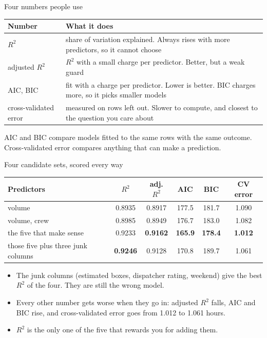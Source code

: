 \documentclass[aspectratio=169]{beamer}
\begin{document}
\begin{frame}{Four numbers people use}
\begin{center}\small
\begin{tabular}{L{0.22\textwidth} L{0.70\textwidth}}
\toprule
\textbf{Number} & \textbf{What it does} \\
\midrule
$R^2$ & share of variation explained. Always rises with more predictors, so it cannot choose \\
adjusted $R^2$ & $R^2$ with a small charge per predictor. Better, but a weak guard \\
AIC, BIC & fit with a charge per predictor. Lower is better. BIC charges more, so it picks
smaller models \\
cross-validated error & measured on rows left out. Slower to compute, and closest to the
question you care about \\
\bottomrule
\end{tabular}
\end{center}
\vspace{0.2em}
\small
AIC and BIC compare models fitted to the same rows with the same outcome. Cross-validated
error compares anything that can make a prediction.
\end{frame}

\begin{frame}{Four candidate sets, scored every way}
\begin{center}\footnotesize
\begin{tabular}{lccccc}
\toprule
\textbf{Predictors} & \textbf{$R^2$} & \textbf{adj. $R^2$} & \textbf{AIC} & \textbf{BIC} & \textbf{CV error} \\
\midrule
volume & 0.8935 & 0.8917 & 177.5 & 181.7 & 1.090 \\
volume, crew & 0.8985 & 0.8949 & 176.7 & 183.0 & 1.082 \\
the five that make sense & 0.9233 & \textbf{0.9162} & \textbf{165.9} & \textbf{178.4} & \textbf{1.012} \\
those five plus three junk columns & \textbf{0.9246} & 0.9128 & 170.8 & 189.7 & 1.061 \\
\bottomrule
\end{tabular}
\end{center}
\begin{itemize}\small
  \item The junk columns (estimated boxes, dispatcher rating, weekend) give the best $R^2$ of
        the four. They are still the wrong model.
  \item Every other number gets worse when they go in: adjusted $R^2$ falls, AIC and BIC rise,
        and cross-validated error goes from 1.012 to 1.061 hours.
  \item $R^2$ is the only one of the five that rewards you for adding them.
\end{itemize}
\end{frame}
\end{document}
